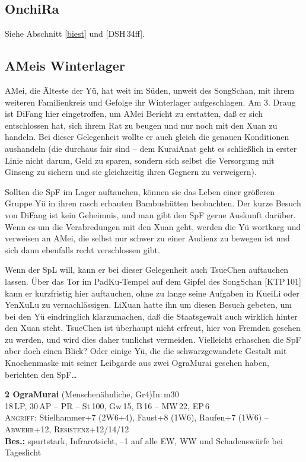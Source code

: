 \documentclass[
a4paper,
twoside,
DIV=calc,
BCOR=4mm,
fontsize=9pt,
twocolumn=on,
titlepage=on,
parskip=half
]{scrartcl}
\begin{document}
\subsection{OnchiRa}

Siehe Abschnitt \ref{biest} und [DSH\,34ff].

\subsection{AMeis Winterlager}
\label{winterlager}

AMei, die Älteste der Yü, hat weit im Süden, unweit des SongSchan, mit
ihrem weiteren Familienkreis und Gefolge ihr Winterlager
aufgeschlagen. Am 3. Draug ist DiFang hier eingetroffen, um AMei
Bericht zu erstatten, daß er sich entschlossen hat, sich ihrem Rat zu
beugen und nur noch mit den Xuan zu handeln. Bei dieser Gelegenheit
wollte er auch gleich die genauen Konditionen aushandeln (die durchaus
fair sind -- dem KuraiAnat geht es schließlich in erster Linie nicht
darum, Geld zu sparen, sondern sich selbst die Versorgung mit Ginseng
zu sichern und sie gleichzeitig ihren Gegnern zu verweigern).

Sollten die SpF im Lager auftauchen, können sie das Leben einer
größeren Gruppe Yü in ihren rasch erbauten Bambushütten
beobachten. Der kurze Besuch von DiFang ist kein Geheimnis, und man
gibt den SpF gerne Auskunft darüber. Wenn es um die Verabredungen mit
den Xuan geht, werden die Yü wortkarg und verweisen an AMei, die
selbst nur schwer zu einer Audienz zu bewegen ist und sich dann
ebenfalls recht verschlossen gibt.

Wenn der SpL will, kann er bei dieser Gelegenheit auch TsueChen
auftauchen lassen. Über das Tor im PadKu-Tempel auf dem Gipfel des
SongSchan [KTP\,101] kann er kurzfristig hier auftauchen, ohne zu
lange seine Aufgaben in KueiLi oder YenXuLu zu vernachlässigen. LiXuan
hatte ihn um diesen Besuch gebeten, um bei den Yü eindringlich
klarzumachen, daß die Staatsgewalt auch wirklich hinter den Xuan
steht. TsueChen ist überhaupt nicht erfreut, hier von Fremden gesehen
zu werden, und wird dies daher tunlichst vermeiden. Vielleicht
erhaschen die SpF aber doch einen Blick? Oder einige Yü, die die
schwarzgewandete Gestalt mit Knochenmaske mit seiner Leibgarde aus
zwei OgraMurai gesehen haben, berichten den SpF\dots

\textbf{2 OgraMurai} (Menschenähnliche, Gr4)\hfill In:\,m30\\
18\,LP, 30\,AP -- PR -- St\,100, Gw\,15, B\,16 -- MW\,22, EP\,6\\
\textsc{Angriff:} Stielhammer+7 (2W6+4), Faust+8 (1W6), Raufen+7 (1W6)
-- \textsc{Abwehr}+12,
\textsc{Resistenz}+12/14/12\\
\textbf{Bes.:} spurtstark, Infrarotsicht, --1 auf alle EW, WW und
Schadenswürfe bei Tageslicht
\end{document}
